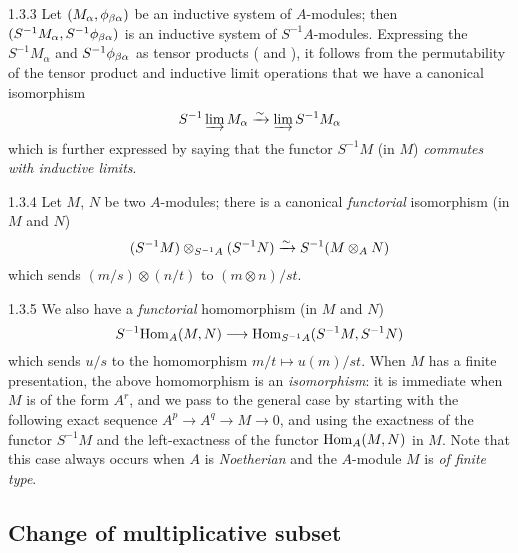 \begin{env}{1.3.3}
\label{env-0.1.3.3}
Let $(M_\alpha,\phi_{\beta\alpha})$ be an inductive system of $A$-modules; then
$(S^{-1}M_\alpha,S^{-1}\phi_{\beta\alpha})$ is an inductive system of
$S^{-1}A$-modules. Expressing the $S^{-1}M_\alpha$ and
$S^{-1}\phi_{\beta\alpha}$ as tensor products ( and
), it follows from the permutability of the tensor product and
inductive limit operations that we have a canonical isomorphism
\[
  S^{-1}\varinjlim M_\alpha\xrightarrow{\sim}\varinjlim S^{-1}M_\alpha
\]
which is further expressed by saying that the functor $S^{-1}M$ (in $M$)
\emph{commutes with inductive limits}.
\end{env}

\begin{env}{1.3.4}
\label{env-0.1.3.4}
Let $M$, $N$ be two $A$-modules; there is a canonical \emph{functorial}
isomorphism (in $M$ and $N$)
\[
  (S^{-1}M)\otimes_{S^{-1}A}(S^{-1}N)\xrightarrow{\sim} S^{-1}(M\otimes_A N)
\]
which sends $(m/s)\otimes(n/t)$ to $(m\otimes n)/st$.
\end{env}

\begin{env}{1.3.5}
\label{env-0.1.3.5}
We also have a \emph{functorial} homomorphism (in $M$ and $N$)
\[
  S^{-1}{\mathop{\mathrm{Hom}}\nolimits}_A(M,N)\longrightarrow{\mathop{\mathrm{Hom}}\nolimits}_{S^{-1}A}(S^{-1}M,S^{-1}N)
\]
which sends $u/s$ to the homomorphism $m/t\mapsto u(m)/st$. When $M$ has a
finite presentation, the above homomorphism is an \emph{isomorphism}: it is
immediate when $M$ is of the form $A^r$, and we pass to the general case by
starting with the following exact sequence $A^p\to A^q\to M\to 0$, and using the
exactness of the functor $S^{-1}M$ and the left-exactness of the functor
${\mathop{\mathrm{Hom}}\nolimits}_A(M,N)$ in $M$. Note that this case always occurs when $A$ is
\emph{Noetherian} and the $A$-module $M$ is \emph{of finite type}.
\end{env}

\subsection{Change of multiplicative subset}
\label{0-prelim-1.4}

